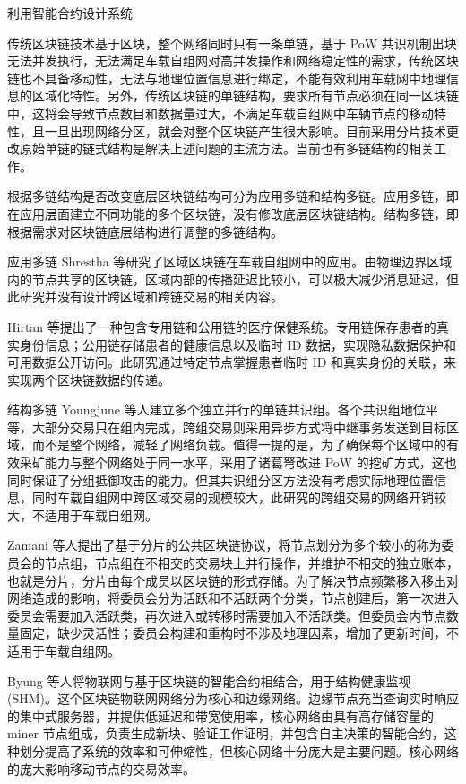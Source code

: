利用智能合约设计系统

传统区块链技术基于区块，整个网络同时只有一条单链，基于 PoW 共识机制出块无法并发执行，无法满足车载自组网对高并发操作和网络稳定性的需求，传统区块链也不具备移动性，无法与地理位置信息进行绑定，不能有效利用车载网中地理信息的区域化特性。另外，传统区块链的单链结构，要求所有节点必须在同一区块链中，这将会导致节点数目和数据量过大，不满足车载自组网中车辆节点的移动特性，且一旦出现网络分区，就会对整个区块链产生很大影响。目前采用分片技术更改原始单链的链式结构是解决上述问题的主流方法。当前也有多链结构的相关工作。\par
根据多链结构是否改变底层区块链结构可分为应用多链和结构多链。应用多链，即在应用层面建立不同功能的多个区块链，没有修改底层区块链结构。结构多链，即根据需求对区块链底层结构进行调整的多链结构。\par
应用多链
Shrestha 等研究了区域区块链在车载自组网中的应用。由物理边界区域内的节点共享的区块链，区域内部的传播延迟比较小，可以极大减少消息延迟，但此研究并没有设计跨区域和跨链交易的相关内容。\par
Hirtan 等提出了一种包含专用链和公用链的医疗保健系统。专用链保存患者的真实身份信息；公用链存储患者的健康信息以及临时 ID 数据，实现隐私数据保护和可用数据公开访问。此研究通过特定节点掌握患者临时 ID 和真实身份的关联，来实现两个区块链数据的传递。\par

结构多链
Youngjune 等人建立多个独立并行的单链共识组。各个共识组地位平等，大部分交易只在组内完成，跨组交易则采用异步方式将中继事务发送到目标区域，而不是整个网络，减轻了网络负载。值得一提的是，为了确保每个区域中的有效采矿能力与整个网络处于同一水平，采用了诸葛弩改进 PoW 的挖矿方式，这也同时保证了分组抵御攻击的能力。但其共识组分区方法没有考虑实际地理位置信息，同时车载自组网中跨区域交易的规模较大，此研究的跨组交易的网络开销较大，不适用于车载自组网。\par
Zamani 等人提出了基于分片的公共区块链协议，将节点划分为多个较小的称为委员会的节点组，节点组在不相交的交易块上并行操作，并维护不相交的独立账本，也就是分片，分片由每个成员以区块链的形式存储。为了解决节点频繁移入移出对网络造成的影响，将委员会分为活跃和不活跃两个分类，节点创建后，第一次进入委员会需要加入活跃类，再次进入或转移时需要加入不活跃类。但委员会内节点数量固定，缺少灵活性；委员会构建和重构时不涉及地理因素，增加了更新时间，不适用于车载自组网。\par

Byung 等人将物联网与基于区块链的智能合约相结合，用于结构健康监视 (SHM)。这个区块链物联网网络分为核心和边缘网络。边缘节点充当查询实时响应的集中式服务器，并提供低延迟和带宽使用率，核心网络由具有高存储容量的miner 节点组成，负责生成新块、验证工作证明，并包含自主决策的智能合约，这种划分提高了系统的效率和可伸缩性，但核心网络十分庞大是主要问题。核心网络的庞大影响移动节点的交易效率。\par

